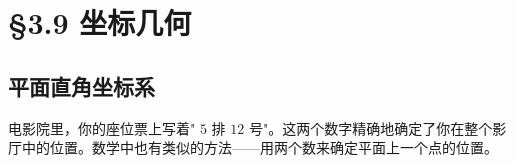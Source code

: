 \chapter{§3.9 坐标几何}
\label{sec:3.9}





\section*{平面直角坐标系}


\begin{explore}


电影院里，你的座位票上写着" $5$ 排 $12$ 号"。这两个数字精确地确定了你在整个影厅中的位置。数学中也有类似的方法——用两个数来确定平面上一个点的位置。

\end{explore}

